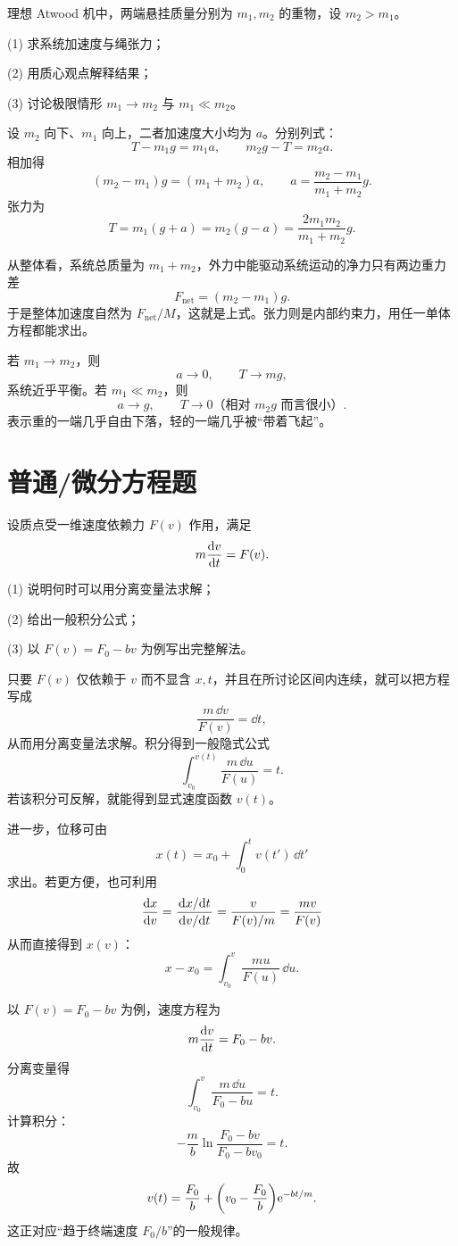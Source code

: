 \begin{university}
理想 Atwood 机中，两端悬挂质量分别为 $m_1,m_2$ 的重物，设 $m_2>m_1$。

(1) 求系统加速度与绳张力；

(2) 用质心观点解释结果；

(3) 讨论极限情形 $m_1\to m_2$ 与 $m_1\ll m_2$。

\begin{solution}
设 $m_2$ 向下、$m_1$ 向上，二者加速度大小均为 $a$。分别列式：
\[
T-m_1 g=m_1 a,
\qquad
m_2 g-T=m_2 a.
\]
相加得
\[
(m_2-m_1)g=(m_1+m_2)a,
\qquad
a=\frac{m_2-m_1}{m_1+m_2}g.
\]
张力为
\[
T=m_1(g+a)=m_2(g-a)=\frac{2m_1m_2}{m_1+m_2}g.
\]

从整体看，系统总质量为 $m_1+m_2$，外力中能驱动系统运动的净力只有两边重力差
\[
F_\text{net}=(m_2-m_1)g.
\]
于是整体加速度自然为 $F_\text{net}/M$，这就是上式。张力则是内部约束力，用任一单体方程都能求出。

若 $m_1\to m_2$，则
\[
a\to 0,
\qquad T\to mg,
\]
系统近乎平衡。若 $m_1\ll m_2$，则
\[
a\to g,
\qquad T\to 0\text{（相对 }m_2g\text{ 而言很小）}.
\]
表示重的一端几乎自由下落，轻的一端几乎被“带着飞起”。
\end{solution}
\end{university}

\section*{普通/微分方程题}

\begin{problem}
设质点受一维速度依赖力 $F(v)$ 作用，满足
\[
m\dv{v}{t}=F(v).
\]

(1) 说明何时可以用分离变量法求解；

(2) 给出一般积分公式；

(3) 以 $F(v)=F_0-bv$ 为例写出完整解法。

\begin{solution}
只要 $F(v)$ 仅依赖于 $v$ 而不显含 $x,t$，并且在所讨论区间内连续，就可以把方程写成
\[
\frac{m\,\dd v}{F(v)}=\dd t,
\]
从而用分离变量法求解。积分得到一般隐式公式
\[
\int_{v_0}^{v(t)} \frac{m\,\dd u}{F(u)}=t.
\]
若该积分可反解，就能得到显式速度函数 $v(t)$。

进一步，位移可由
\[
x(t)=x_0+\int_0^t v(t')\,\dd t'
\]
求出。若更方便，也可利用
\[
\dv{x}{v}=\frac{\dv*{x}{t}}{\dv*{v}{t}}=\frac{v}{F(v)/m}=\frac{mv}{F(v)}
\]
从而直接得到 $x(v)$：
\[
x-x_0=\int_{v_0}^{v}\frac{mu}{F(u)}\,\dd u.
\]

以 $F(v)=F_0-bv$ 为例，速度方程为
\[
m\dv{v}{t}=F_0-bv.
\]
分离变量得
\[
\int_{v_0}^{v}\frac{m\,\dd u}{F_0-bu}=t.
\]
计算积分：
\[
-\frac{m}{b}\ln\frac{F_0-bv}{F_0-bv_0}=t.
\]
故
\[
v(t)=\frac{F_0}{b}+\qty(v_0-\frac{F_0}{b})\mathrm e^{-bt/m}.
\]
这正对应“趋于终端速度 $F_0/b$”的一般规律。
\end{solution}
\end{problem}

